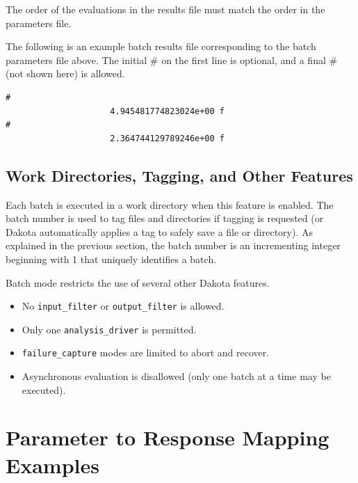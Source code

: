 The order of the evaluations in the results file must match the order in the
parameters file.

The following is an example batch results file corresponding to the batch
parameters file above. The initial \# on the first line is optional, and a
final \# (not shown here) is allowed.
\begin{small}
\begin{verbatim}
#
                     4.945481774823024e+00 f
#
                     2.364744129789246e+00 f
\end{verbatim}
\end{small}


\subsection{Work Directories, Tagging, and Other Features}

Each batch is executed in a work directory when this feature is enabled.
The batch number is used to tag files and directories if tagging is requested
(or Dakota automatically applies a tag to safely save a file or directory). As
explained in the previous section, the batch number is an incrementing integer
beginning with 1 that uniquely identifies a batch.

Batch mode restricts the use of several other Dakota features.

\begin{itemize}

  \item No \texttt{input\_filter} or \texttt{output\_filter} is allowed.
  \item Only one \texttt{analysis\_driver} is permitted.
  \item \texttt{failure\_capture} modes are limited to abort and recover.
  \item Asynchronous evaluation is disallowed (only one batch at a time may be executed).
\end{itemize}


\section{Parameter to Response Mapping Examples}\label{interfaces:mappings}

